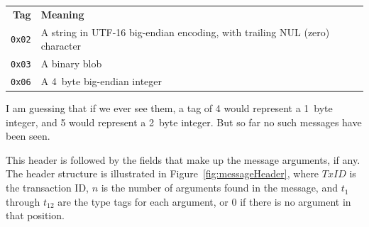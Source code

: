 \documentclass[11pt]{article}
\begin{document}
\begin{center}
  \begin{tabu}{rX}
    \toprule

    \bfseries{Tag} & \bfseries{Meaning} \\

    {\tt 0x02} & A string in UTF-16 big-endian encoding, with trailing
    NUL (zero) character \\

    {\tt 0x03} & A binary blob \\

    {\tt 0x06} & A 4~byte big-endian integer \\
    \bottomrule
  \end{tabu}
\end{center}

I am guessing that if we ever see them, a tag of 4 would represent a
1~byte integer, and 5 would represent a 2~byte integer. But so far no
such messages have been seen.

This header is followed by the fields that make up the message
arguments, if any. The header structure is illustrated in
Figure~\ref{fig:messageHeader}, where $TxID$ is the transaction ID,
$n$ is the number of arguments found in the message, and $t_1$ through
$t_{12}$ are the type tags for each argument, or 0 if there is no
argument in that position.
\end{document}
